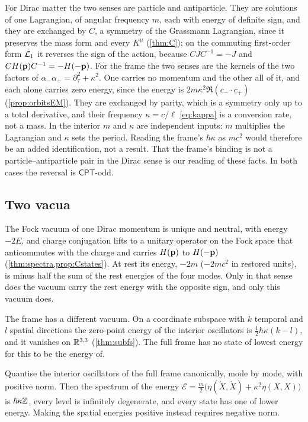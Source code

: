 For Dirac matter the two senses are particle and antiparticle. They are solutions of one Lagrangian, of angular frequency $m$, each with
energy of definite sign, and they are exchanged by $C$, a symmetry of the Grassmann Lagrangian, since it preserves the mass form and every
$K^\mu$ (\cref{thm:C}); on the commuting first-order form $\mathcal L_1$ it reverses the sign of the action, because $CJC^{-1}=-J$ and
$CH(\mathbf p)C^{-1}=-H(-\mathbf p)$. For the frame the two senses are the kernels of the two factors of $\alpha_-\alpha_+=\partial_\tau^2+\kappa^2$. One
carries no momentum and the other all of it, and each alone carries zero energy, since the energy is $2m\kappa^2\Re(c_-\cdot c_+)$
(\cref{prop:orbitsEM}). They are exchanged by parity, which is a symmetry only up to a total derivative, and their frequency
$\kappa=c/\ell$ \eqref{eq:kappa} is a conversion rate, not a mass. In the interior $m$ and $\kappa$ are independent inputs: $m$ multiplies the
Lagrangian and $\kappa$ sets the period. Reading the frame's $\hbar\kappa$ as $mc^2$ would therefore be an added identification, not a result.
That the frame's binding is not a particle--antiparticle pair in the Dirac sense is our reading of these facts. In both cases the
reversal is $\mathsf{CPT}$-odd.

\subsection{Two vacua}
\label{sec:masstwovacua}

The Fock vacuum of one Dirac momentum is unique and neutral, with energy $-2E$, and charge conjugation lifts to a unitary operator on
the Fock space that anticommutes with the charge and carries $H(\mathbf p)$ to $H(-\mathbf p)$ (\cref{thm:spectra,prop:Cstates}). At rest its energy,
$-2m$ ($-2mc^2$ in restored units), is minus half the sum of the rest energies of the four modes. Only in that sense does the vacuum
carry the rest energy with the opposite sign, and only this vacuum does.

The frame has a different vacuum. On a coordinate subspace with $k$ temporal and $l$ spatial directions the zero-point energy of the
interior oscillators is $\tfrac12\hbar\kappa(k-l)$, and it vanishes on $\mathbb{R}^{3,3}$ (\cref{thm:subfs}). The full frame has no state of
lowest energy for this to be the energy of.

\begin{corollary}
\label{mb:noground}
Quantise the interior oscillators of the full frame canonically, mode by mode, with positive norm. Then the spectrum of the energy
$\mathcal E=\tfrac m2\bigl(\eta(\dot X,\dot X)+\kappa^2\eta(X,X)\bigr)$ is $\hbar\kappa\mathbb{Z}$, every level is infinitely degenerate, and every state has one
of lower energy. Making the spatial energies positive instead requires negative norm.
\end{corollary}

